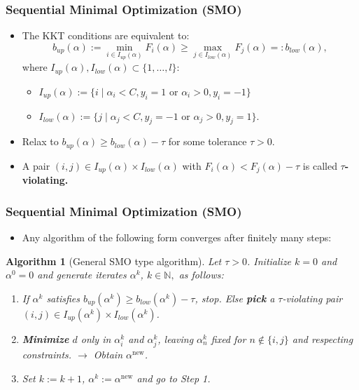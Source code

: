 \documentclass[12pt, compress]{beamer}
\newcommand{\titleC}{Sequential Minimal Optimization (SMO)}
\newtheorem{algorithm}{Algorithm}
\begin{document}
\begin{frame}
\frametitle{\titleC}
\begin{itemize}
	
	\item The KKT conditions are equivalent to:
	\begin{equation*}\label{equiv_KKT}
	b_{up}(\alpha) := \min_{i \in I_{up}(\alpha)} F_i(\alpha) \geq \max_{j \in I_{low}(\alpha)} F_j(\alpha) =: b_{low}(\alpha),
	\end{equation*}
	where $I_{up}(\alpha), I_{low}(\alpha) \subset \{1,\ldots,l\}$: \begin{itemize}
		\item $I_{up}(\alpha) := \{ i \mid  \alpha_i < C, y_i = 1 \text{ or } \alpha_i > 0, y_i = -1 \}$
		\item $I_{low}(\alpha) := \{ j \mid \alpha_j < C, y_j = -1 \text{ or } \alpha_j > 0, y_j = 1 \}$.
	
	\end{itemize}
	\item Relax to $b_{up}(\alpha) \geq b_{low}(\alpha) - \tau$ for some tolerance $\tau > 0$.
	\item A pair $(i,j) \in I_{up}(\alpha) \times I_{low}(\alpha)$ with $F_i(\alpha) < F_j(\alpha) - \tau$ is called \textbf{\alert{$\tau$-violating. }}
\end{itemize}
\end{frame}


\begin{frame}
\frametitle{\titleC}
	\begin{itemize}
		\item Any algorithm of the following form converges after finitely many steps:
	\end{itemize}
	\begin{algorithm}[General SMO type algorithm]\label{GSMO} Let $\tau > 0$. Initialize $k = 0 $ and $\alpha^0 = 0$ and generate iterates $\alpha^k$, $k \in \mathbb{N},$ as follows: 
		\begin{enumerate}
			\item If $\alpha^k$ satisfies $b_{up}(\alpha^k) \geq b_{low}(\alpha^k) - \tau$, stop. Else \textbf{\alert{pick}} a $\tau$-violating pair $(i,j) \in I_{up}(\alpha^k) \times I_{low}(\alpha^k)$.
			\item \textbf{\alert{Minimize}} $d$ only in $\alpha^k_i$ and $\alpha^k_j$, leaving $\alpha^k_n$ fixed for $n \notin \{i,j\}$ and respecting constraints. $\rightarrow$ Obtain \textbf{\alert{$\alpha^{\text{new}}$}}.
			\item Set $k := k+1$, $\alpha^k := \alpha^{\text{new}}$ and go to Step 1.
		\end{enumerate}
	\end{algorithm}
\end{frame}
\end{document}
